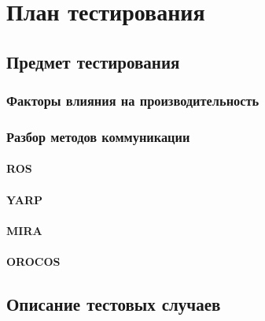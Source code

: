 \chapter{План тестирования}
\label{title:chapter2}

\section{Предмет тестирования}
\label{title:chapter2:performance_subject}
	\subsection{Факторы влияния на производительность \marm{}}
	\label{title:chapter2:performance_factors}
	
	
	\subsection{Разбор методов коммуникации \marm{}}
	\label{title:chapter2:performance_approaches}
		\subsubsection{ROS}
		\label{title:chapter2:performance_ros_approaches}
		
		
		\subsubsection{YARP}
		\label{title:chapter2:performance_yarp_approaches}
		

		\subsubsection{MIRA}
		\label{title:chapter2:performance_mira_approaches}
		
		
		\subsubsection{OROCOS}
		\label{title:chapter2:performance_orocos_approaches}
		

\section{Описание тестовых случаев}
\label{title:chapter2:performance_test_cases}

	
